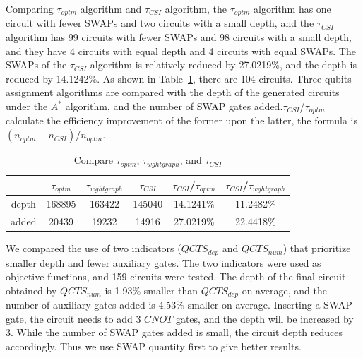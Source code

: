 \documentclass[runningheads]{llncs}
\begin{document}
Comparing $\tau_{optm}$ algorithm and $\tau_{CSI}$ algorithm, the $\tau_{optm}$ algorithm has one circuit with fewer SWAPs and two circuits with a small depth, and the $\tau_{CSI}$ algorithm has 99 circuits with fewer SWAPs and 98 circuits with a small depth, 
and they have 4 circuits with equal depth and 4 circuits with equal SWAPs. The SWAPs of the $\tau_{CSI}$ algorithm is relatively reduced by 27.0219\%, and the depth is reduced by 14.1242\%. As shown in Table~\ref{tab1}, there are 104 circuits. Three qubits assignment algorithms are compared with the depth of the generated circuits under the $A^{*}$ algorithm, and the number of SWAP gates added.$\tau_{CSI}$/$\tau_{optm}$  calculate the efficiency improvement of the former upon the latter, the formula is $(n_{optm}-n_{CSI})/n_{optm}$.
\begin{table}
	\begin{center}  
	\begin{tabular}{|c|c|c|c|c|c|}
	\hline
	    	&  $\tau_{optm}$ & $\tau_{wghtgraph}$ &$\tau_{CSI}$& $\tau_{CSI}$/$\tau_{optm}$ & $\tau_{CSI}$/$\tau_{wghtgraph}$\\
	\hline
	 depth 	 &	168895	&   163422	&  145040 	& 14.1241\%  &11.2482\%   \\
	\hline
	 added 	&	20439	&  19232 	&  14916 & 27.0219\% 	&  22.4418\%  \\
	\hline
	\end{tabular} 
	\end{center} 
	\caption{Compare $\tau_{optm}$, $\tau_{wghtgraph}$, and $\tau_{CSI}$ }
	\label{tab1}
	\end{table}

	We compared the use of two indicators ($QCTS_{dep}$ and $QCTS_{num}$) that prioritize smaller depth and fewer auxiliary gates. The two indicators were used as objective functions, and 159 circuits were tested. The depth of the final circuit obtained by $QCTS_{num}$ is 1.93\% smaller than $QCTS_{dep}$ on average, and the number of auxiliary gates added is 4.53\% smaller on average. Inserting a SWAP gate, the circuit needs to add 3 $CNOT$ gates, and the depth will be increased by 3. While the number of SWAP gates added is small, the circuit depth reduces accordingly. Thus we use SWAP quantity first to give better results. 
\end{document}

